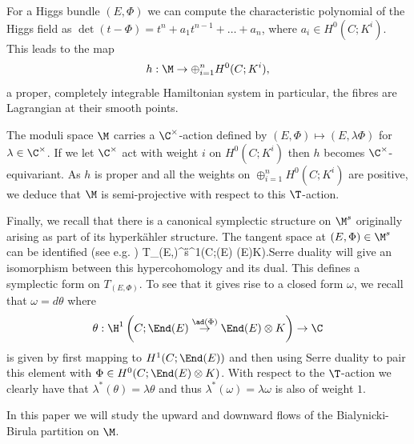 For a Higgs bundle $(E,\Phi)$ we can compute the characteristic polynomial of the Higgs field as $\det(t-\Phi)=t^n+a_{1}t^{n-1}+\dots+a_n$, where $a_i\in H^0(C;K^i)$. This leads to the  map $$h:\M\to \oplus_{i=1}^n  H^0(C;K^i),$$ a proper, completely integrable Hamiltonian system \cite{hitchin-stable,simpson,nitsure} in particular, the fibres are Lagrangian at their smooth points.

The moduli space $\M$ carries a $\C^\times$-action defined by $(E,\Phi)\mapsto (E,\lambda\Phi)$ for $\lambda\in \C^\times$. If we let $\C^\times$ act with weight $i$ on  $H^0(C;K^i)$ then $h$ becomes $\C^\times$-equivariant. As $h$ is proper and all the weights on $\oplus_{i=1}^n  H^0(C;K^i)$ are positive, we  deduce that $\M$ is semi-projective with respect to this $\T$-action.

Finally, we recall that there is a canonical symplectic structure on $\M^s$ originally arising as part of its hyperk\"ahler structure. The tangent space at $(E,\Phi)\in \M^s$ can be identified (see e.g. \cite{biswas-ramanan})
\beq\label{tangent} T_{(E,\Phi)}\M^s\cong \H^1\left(C;\End(E)\stackrel{\ad(\Phi)}{\to} \End(E)\otimes K\right).\eeq Serre duality will give an isomorphism between this hypercohomology and its dual. This defines a symplectic form on $T_{(E,\Phi)}$. To see that it gives rise to a closed form $\omega$, we recall \cite[Theorem 4.3]{biswas-ramanan} that $\omega=d\theta$ where $$\theta:\H^1\left(C;\End(E)\stackrel{\ad(\Phi)}{\to}\End(E)\otimes K\right)\to \C$$ is given by first mapping to $H^1(C;\End(E))$ and then using  Serre duality to pair this element with $\Phi\in H^0(C;\End(E)\otimes K)$.  With respect to the $\T$-action we clearly have that $\lambda^*(\theta)=\lambda\theta$ and thus $\lambda^*(\omega)=\lambda\omega$ is also of weight $1$.


In this paper we will study the upward and downward flows of the Bialynicki-Birula partition on $\M$.

